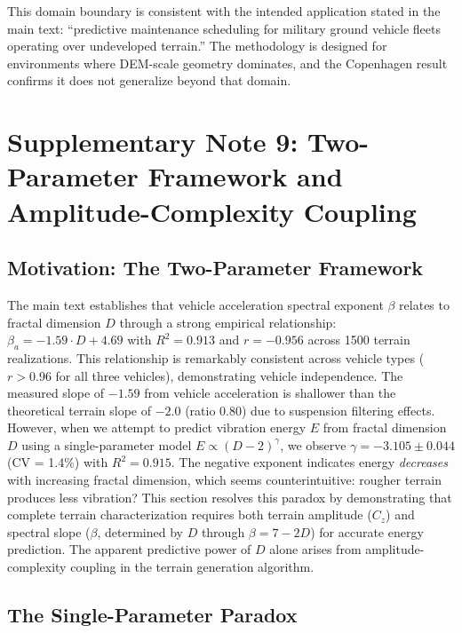 \documentclass[11pt]{article}
\begin{document}
This domain boundary is consistent with the intended application stated in the main text: ``predictive maintenance scheduling for military ground vehicle fleets operating over undeveloped terrain.'' The methodology is designed for environments where DEM-scale geometry dominates, and the Copenhagen result confirms it does not generalize beyond that domain.

\newpage

\section{Supplementary Note 9: Two-Parameter Framework and Amplitude-Complexity Coupling}

\subsection{Motivation: The Two-Parameter Framework}

The main text establishes that vehicle acceleration spectral exponent $\beta$ relates to fractal dimension $D$ through a strong empirical relationship: $\beta_a = -1.59 \cdot D + 4.69$ with $R^2 = 0.913$ and $r = -0.956$ across 1500 terrain realizations. This relationship is remarkably consistent across vehicle types ($r > 0.96$ for all three vehicles), demonstrating vehicle independence. The measured slope of $-1.59$ from vehicle acceleration is shallower than the theoretical terrain slope of $-2.0$ (ratio 0.80) due to suspension filtering effects. However, when we attempt to predict vibration energy $E$ from fractal dimension $D$ using a single-parameter model $E \propto (D-2)^\gamma$, we observe $\gamma = -3.105 \pm 0.044$ (CV = 1.4\%) with $R^2 = 0.915$. The negative exponent indicates energy \textit{decreases} with increasing fractal dimension, which seems counterintuitive: rougher terrain produces less vibration? This section resolves this paradox by demonstrating that complete terrain characterization requires both terrain amplitude ($C_z$) and spectral slope ($\beta$, determined by $D$ through $\beta = 7-2D$) for accurate energy prediction. The apparent predictive power of $D$ alone arises from amplitude-complexity coupling in the terrain generation algorithm.

\subsection{The Single-Parameter Paradox}
\end{document}
